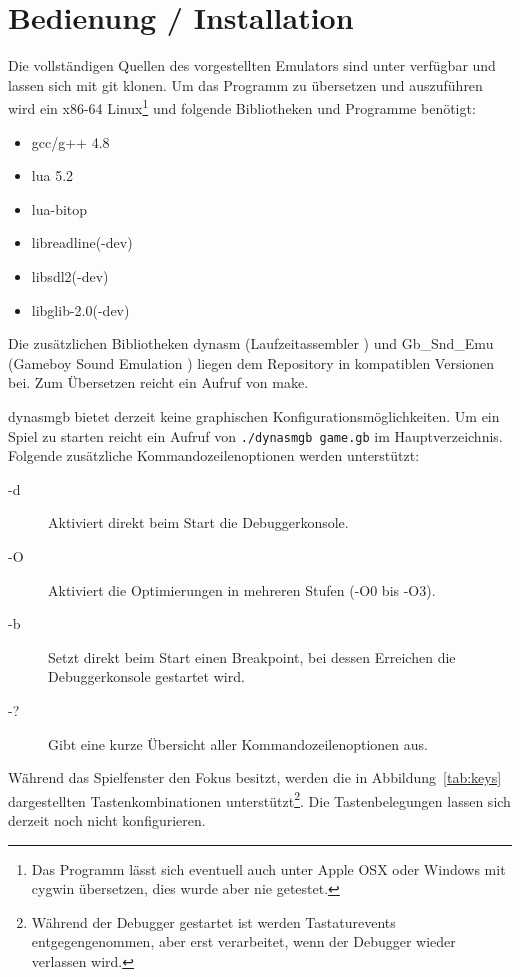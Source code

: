 \documentclass[a4paper]{scrartcl}
\begin{document}
\section{Bedienung / Installation}

Die vollständigen Quellen des vorgestellten Emulators sind unter \cite{dynasmgb} verfügbar und lassen sich mit git klonen. Um das Programm zu übersetzen und auszuführen wird ein x86-64 Linux\footnote{Das Programm lässt sich eventuell auch unter Apple OSX oder Windows mit cygwin übersetzen, dies wurde aber nie getestet.} und folgende Bibliotheken und Programme benötigt:

\begin{itemize}
\item gcc/g++ 4.8
\item lua 5.2
\item lua-bitop
\item libreadline(-dev)
\item libsdl2(-dev)
\item libglib-2.0(-dev)
\end{itemize}

Die zusätzlichen Bibliotheken dynasm (Laufzeitassembler \cite{dynasm}) und Gb\_Snd\_Emu (Gameboy Sound Emulation \cite{audio_lib}) liegen dem Repository in kompatiblen Versionen bei. Zum Übersetzen reicht ein Aufruf von make.

dynasmgb bietet derzeit keine graphischen Konfigurationsmöglichkeiten. Um ein Spiel zu starten reicht ein Aufruf von \verb|./dynasmgb game.gb| im Hauptverzeichnis. Folgende zusätzliche Kommandozeilenoptionen werden unterstützt:

\begin{description}
\item[-d] Aktiviert direkt beim Start die Debuggerkonsole.
\item[-O] Aktiviert die Optimierungen in mehreren Stufen (-O0 bis -O3).
\item[-b] Setzt direkt beim Start einen Breakpoint, bei dessen Erreichen die Debuggerkonsole gestartet wird.
\item[-?] Gibt eine kurze Übersicht aller Kommandozeilenoptionen aus.
\end{description}

Während das Spielfenster den Fokus besitzt, werden die in Abbildung~\ref{tab:keys} dargestellten Tastenkombinationen unterstützt\footnote{Während der Debugger gestartet ist werden Tastaturevents entgegengenommen, aber erst verarbeitet, wenn der Debugger wieder verlassen wird.}. Die Tastenbelegungen lassen sich derzeit noch nicht konfigurieren.
\end{document}
